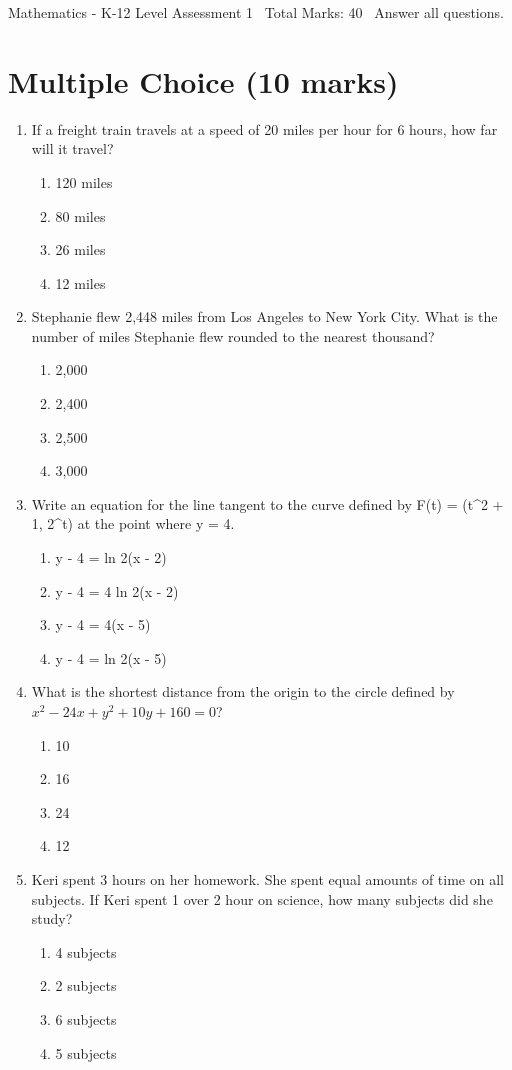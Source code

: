 \documentclass[12pt]{article}
\begin{document}
\begin{center}
Mathematics - K-12 Level Assessment 1 \
Total Marks: 40 \
Answer all questions.
\end{center}

\section*{Multiple Choice (10 marks)}
\begin{enumerate}[label=\arabic*.]
\item If a freight train travels at a speed of 20 miles per hour for 6 hours, how far will it
travel?
\begin{enumerate}[label=(\alph*)]
    \item 120 miles
    \item 80 miles
    \item 26 miles
    \item 12 miles
\end{enumerate}
\item Stephanie flew 2,448 miles from Los Angeles to New York City. What is the number of miles
Stephanie flew rounded to the nearest thousand?
\begin{enumerate}[label=(\alph*)]
    \item 2,000
    \item 2,400
    \item 2,500
    \item 3,000
\end{enumerate}
\item Write an equation for the line tangent to the curve defined by F(t) = (t\^{}2 + 1, 2\^{}t) at
the point where y = 4.
\begin{enumerate}[label=(\alph*)]
    \item y - 4 = ln 2(x - 2)
    \item y - 4 = 4 ln 2(x - 2)
    \item y - 4 = 4(x - 5)
    \item y - 4 = ln 2(x - 5)
\end{enumerate}
\item What is the shortest distance from the origin to the circle defined by $x^2-24x +y^2+10y
+160=0$?
\begin{enumerate}[label=(\alph*)]
    \item 10
    \item 16
    \item 24
    \item 12
\end{enumerate}
\item Keri spent 3 hours on her homework. She spent equal amounts of time on all subjects. If
Keri spent 1 over 2 hour on science, how many subjects did she study?
\begin{enumerate}[label=(\alph*)]
    \item 4 subjects
    \item 2 subjects
    \item 6 subjects
    \item 5 subjects
\end{enumerate}
\end{enumerate}
\end{document}
